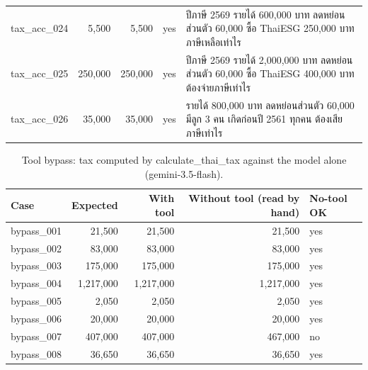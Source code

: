 \documentclass[11pt,a4paper]{article}
\begin{document}
{\begin{longtable}{lrrlp{8.6cm}}
tax\_\allowbreak{}acc\_\allowbreak{}024 & 5,500 & 5,500 & yes & {\thaifont ปีภาษี }2569 {\thaifont รายได้ }600,000 {\thaifont บาท ลดหย่อนส่วนตัว }60,000 {\thaifont ซื้อ }ThaiESG 250,000 {\thaifont บาท ภาษีเหลือเท่าไร} \\
tax\_\allowbreak{}acc\_\allowbreak{}025 & 250,000 & 250,000 & yes & {\thaifont ปีภาษี }2569 {\thaifont รายได้ }2,000,000 {\thaifont บาท ลดหย่อนส่วนตัว }60,000 {\thaifont ซื้อ }ThaiESG 400,000 {\thaifont บาท ต้องจ่ายภาษีเท่าไร} \\
tax\_\allowbreak{}acc\_\allowbreak{}026 & 35,000 & 35,000 & yes & {\thaifont รายได้ }800,000 {\thaifont บาท ลดหย่อนส่วนตัว }60,000 {\thaifont มีลูก }3 {\thaifont คน เกิดก่อนปี }2561 {\thaifont ทุกคน ต้องเสียภาษีเท่าไร} \\
\end{longtable}}
\begin{table}[H]
\centering
\small
\caption{Tool bypass: tax computed by calculate\_thai\_tax against the model alone (gemini-3.5-flash).}\label{tab:tax-bypass}
\begin{tabular}{lrrrl}
\toprule
\textbf{Case} & \textbf{Expected} & \textbf{With tool} & \textbf{Without tool (read by hand)} & \textbf{No-tool OK} \\
\midrule
bypass\_\allowbreak{}001 & 21,500 & 21,500 & 21,500 & yes \\
bypass\_\allowbreak{}002 & 83,000 & 83,000 & 83,000 & yes \\
bypass\_\allowbreak{}003 & 175,000 & 175,000 & 175,000 & yes \\
bypass\_\allowbreak{}004 & 1,217,000 & 1,217,000 & 1,217,000 & yes \\
bypass\_\allowbreak{}005 & 2,050 & 2,050 & 2,050 & yes \\
bypass\_\allowbreak{}006 & 20,000 & 20,000 & 20,000 & yes \\
bypass\_\allowbreak{}007 & 407,000 & 407,000 & 467,000 & no \\
bypass\_\allowbreak{}008 & 36,650 & 36,650 & 36,650 & yes \\
\bottomrule
\end{tabular}
\end{table}
\end{document}

